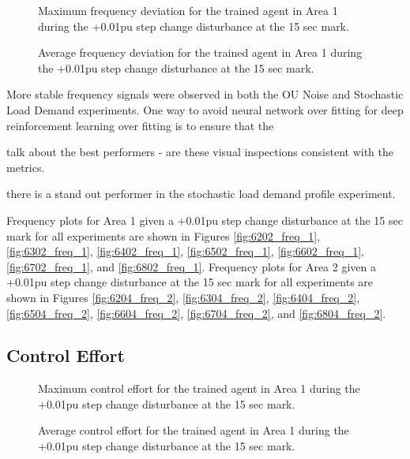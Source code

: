 \begin{figure}[h]
	\begin{minipage}[t]{0.50\textwidth}
		\centering
		\resizebox{7cm}{!}{}
		\caption{Maximum frequency deviation for the trained agent in Area 1 during the +0.01pu step change disturbance at the 15 sec mark.}\label{fig:7203_max_freq}
	\end{minipage}
	\hspace{0.25cm}
	\begin{minipage}[t]{0.50\textwidth}
		\resizebox{7cm}{!}{}
		\caption{Average frequency deviation for the trained agent in Area 1 during the +0.01pu step change disturbance at the 15 sec mark.}\label{fig:7204_avg_freq}
	\end{minipage}
\end{figure}

More stable frequency signals were observed in both the OU Noise and Stochastic Load Demand experiments. 
One way to avoid neural network over fitting for deep reinforcement learning over fitting is to ensure that the 



talk about the best performers - are these visual inspections consistent with the metrics.

there is a stand out performer in the stochastic load demand profile experiment.

Frequency plots for Area 1 given a +0.01pu step change disturbance at the 15 sec mark for all experiments are shown in Figures \ref{fig:6202_freq_1}, \ref{fig:6302_freq_1}, \ref{fig:6402_freq_1}, \ref{fig:6502_freq_1}, \ref{fig:6602_freq_1}, \ref{fig:6702_freq_1}, and \ref{fig:6802_freq_1}. Frequency plots for Area 2 given a +0.01pu step change disturbance at the 15 sec mark for all experiments are shown in Figures \ref{fig:6204_freq_2}, \ref{fig:6304_freq_2}, \ref{fig:6404_freq_2}, \ref{fig:6504_freq_2}, \ref{fig:6604_freq_2}, \ref{fig:6704_freq_2}, and \ref{fig:6804_freq_2}.


\subsection{Control Effort}

\begin{figure}[h]
	\begin{minipage}[t]{0.50\textwidth}
		\centering
		\resizebox{7cm}{!}{}
		\caption{Maximum control effort for the trained agent in Area 1 during the +0.01pu step change disturbance at the 15 sec mark.}
	\end{minipage}
	\hspace{0.25cm}
	\begin{minipage}[t]{0.50\textwidth}
		\resizebox{7cm}{!}{}
		\caption{Average control effort for the trained agent in Area 1 during the +0.01pu step change disturbance at the 15 sec mark.}
	\end{minipage}
\end{figure}

